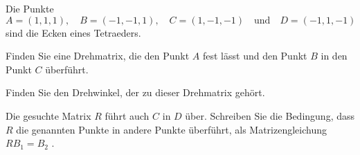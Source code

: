 Die Punkte
\[
A=( 1, 1, 1),\quad
B=(-1,-1, 1),\quad
C=( 1,-1,-1)
\quad\text{und}\quad
D=(-1, 1,-1)
\]
sind die Ecken eines Tetraeders.
\begin{teilaufgaben}
\item
Finden Sie eine Drehmatrix, die den Punkt $A$ fest lässt und den
Punkt $B$ in den Punkt $C$ überführt.
\item
Finden Sie den Drehwinkel, der zu dieser Drehmatrix gehört.
\end{teilaufgaben}

\begin{hinweis}
Die gesuchte Matrix $R$ führt auch $C$ in $D$ über.
Schreiben Sie die Bedingung, dass $R$ die genannten Punkte in andere
Punkte überführt, als Matrizengleichung%
{} $RB_1=B_2$%
.
\end{hinweis}

